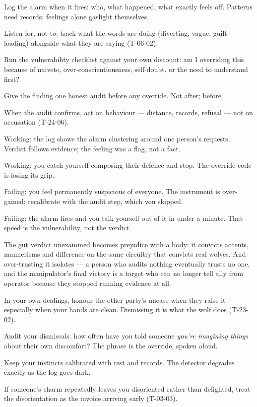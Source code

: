 \begin{application}
  \item Log the alarm when it fires: who, what happened, what exactly feels off. Patterns need records; feelings alone gaslight themselves.
  \item Listen for, not to: track what the words are doing (diverting, vague, guilt-loading) alongside what they are saying (T-06-02).
  \item Run the vulnerability checklist against your own discount: am I overriding this because of naivete, over-conscientiousness, self-doubt, or the need to understand first?
  \item Give the finding one honest audit before any override. Not after; before.
  \item When the audit confirms, act on behaviour --- distance, records, refusal --- not on accusation (T-24-06).
\end{application}
\begin{feedback}
  \item Working: the log shows the alarm clustering around one person's requests. Verdict follows evidence; the feeling was a flag, not a fact.
  \item Working: you catch yourself composing their defence and stop. The override code is losing its grip.
  \item Failing: you feel permanently suspicious of everyone. The instrument is over-gained; recalibrate with the audit step, which you skipped.
  \item Failing: the alarm fires and you talk yourself out of it in under a minute. That speed is the vulnerability, not the verdict.
\end{feedback}
\begin{failure}
The gut verdict unexamined becomes prejudice with a body: it convicts accents, mannerisms and difference on the same circuitry that convicts real wolves. And over-trusting it isolates --- a person who audits nothing eventually trusts no one, and the manipulator's final victory is a target who can no longer tell ally from operator because they stopped running evidence at all.
\end{failure}
\begin{countermeasures}
  \item In your own dealings, honour the other party's unease when they raise it --- especially when your hands are clean. Dismissing it is what the wolf does (T-23-02).
  \item Audit your dismissals: how often have you told someone \emph{you're imagining things} about their own discomfort? The phrase is the override, spoken aloud.
  \item Keep your instincts calibrated with rest and records. The detector degrades exactly as the log goes dark.
  \item If someone's charm repeatedly leaves you disoriented rather than delighted, treat the disorientation as the invoice arriving early (T-03-03).
\end{countermeasures}

\seesources
{}
